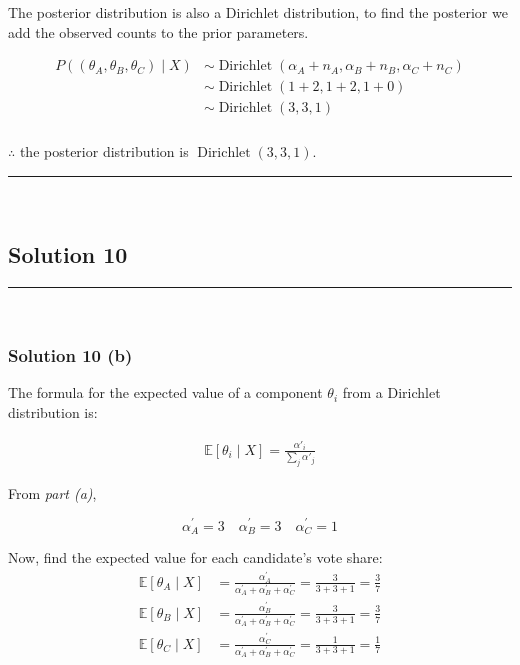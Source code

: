 \documentclass{article}
\begin{document}
\begin{flushleft}
    The posterior distribution is also a Dirichlet distribution, to find the posterior we add the observed counts to the prior parameters.
\end{flushleft}

\begin{align*}
    P((\theta_{A},\theta_{B},\theta_{C}) \mid X) &\sim \operatorname{Dirichlet}(\alpha_A + n_A, \alpha_B + n_B, \alpha_C + n_C) \\
    &\sim \operatorname{Dirichlet}(1 + 2, 1 + 2, 1 + 0) \\
    &\sim \operatorname{Dirichlet}(3, 3, 1)
\end{align*}

\subsubsection*{\normalfont}{$\therefore$ the posterior distribution is $\operatorname{Dirichlet}(3, 3, 1)$.} \\

\noindent\rule{\textwidth}{0.4pt}\\

\newpage

\subsection*{Solution 10}
\noindent\rule{\textwidth}{0.4pt}\\
\subsubsection*{Solution 10 (b)}
\begin{flushleft}
The formula for the expected value of a component $\theta_i$ from a Dirichlet distribution is:
\end{flushleft}

\begin{align*}
    \mathbb{E}[\theta_i \mid X] = \frac{\alpha'_i}{\sum_{j} \alpha'_j}
\end{align*}

\begin{flushleft}
    From \textit{part (a)},
\end{flushleft}
$$\alpha^{\prime}_A = 3 \quad \alpha^{\prime}_B = 3 \quad \alpha^{\prime}_C = 1$$

Now, find the expected value for each candidate's vote share:
\begin{align*}
    \mathbb{E}[\theta_A \mid X] &= \frac{\alpha^{\prime}_A}{\alpha^{\prime}_A+\alpha^{\prime}_B+\alpha^{\prime}_C} = \frac{3}{3+3+1} = \frac{3}{7} \\
    \mathbb{E}[\theta_B \mid X] &= \frac{\alpha^{\prime}_B}{\alpha^{\prime}_A+\alpha^{\prime}_B+\alpha^{\prime}_C} = \frac{3}{3+3+1} = \frac{3}{7} \\
    \mathbb{E}[\theta_C \mid X] &= \frac{\alpha^{\prime}_C}{\alpha^{\prime}_A+\alpha^{\prime}_B+\alpha^{\prime}_C} = \frac{1}{3+3+1} = \frac{1}{7}
\end{align*}
\end{document}
